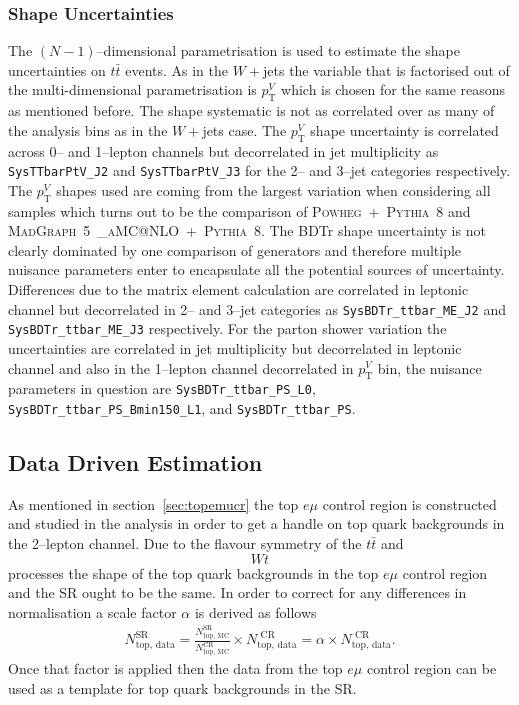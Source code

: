 \subsubsection{Shape Uncertainties}

The $(N-1)$--dimensional parametrisation is used to estimate the shape
uncertainties on $t\bar{t}$ events. As in the $W+$jets the variable that is
factorised out of the multi-dimensional parametrisation is $p_{\mathrm{T}}^V$ which is
chosen for the same reasons as mentioned before. The shape systematic is not as
correlated over as many of the analysis bins as in the $W+$jets case. The
$p_{\mathrm{T}}^V$ shape uncertainty is correlated across 0-- and 1--lepton channels but
decorrelated in jet multiplicity as \texttt{SysTTbarPtV\_J2} and
\texttt{SysTTbarPtV\_J3} for the 2-- and 3--jet categories respectively. The
$p_{\mathrm{T}}^V$ shapes used are coming from the largest variation when considering all
samples which turns out to be the comparison of
\textsc{Powheg}~+~\textsc{Pythia}~8 and
\textsc{MadGraph}~5~\textsc{\_aMC@NLO}~+~\textsc{Pythia}~8. The BDTr shape
uncertainty is not clearly dominated by one comparison of generators and
therefore multiple nuisance parameters enter to encapsulate all the potential
sources of uncertainty. Differences due to the matrix element calculation are
correlated in leptonic channel but decorrelated in 2-- and 3--jet categories as
\texttt{SysBDTr\_ttbar\_ME\_J2} and \texttt{SysBDTr\_ttbar\_ME\_J3}
respectively. For the parton shower variation the uncertainties are correlated
in jet multiplicity but decorrelated in leptonic channel and also in the
1--lepton channel decorrelated in $p_{\mathrm{T}}^V$ bin, the nuisance parameters in
question are \texttt{SysBDTr\_ttbar\_PS\_L0},
\texttt{SysBDTr\_ttbar\_PS\_Bmin150\_L1}, and \texttt{SysBDTr\_ttbar\_PS}.

\subsection{Data Driven Estimation}
\label{sec:ttbar_DD}

As mentioned in section~\ref{sec:topemucr} the top $e\mu$ control region is
constructed and studied in the analysis in order to get a handle on top quark
backgrounds in the 2--lepton channel. Due to the flavour symmetry of the
$t\bar{t}$ and $$Wt$$ processes the shape of the top quark backgrounds in the top
$e\mu$ control region and the SR ought to be the same. In order to correct for
any differences in normalisation a scale factor $\alpha$ is derived as follows
\begin{align}
  N_{\text{top, data}}^{\text{SR}}
  =
  \frac{N_{\text{top, MC}}^{\text{SR}}}{N_{\text{top, MC}}^{\text{CR}}}
  \times
  N_{\text{top, data}}^{\text{ CR}}
  = \alpha \times N_{\text{top, data}}^{\text{ CR}}.
  \label{eq:TTbar_DD_ExtrapFac}
\end{align}
Once that factor is applied then the data from the top $e\mu$ control region can
be used as a template for top quark backgrounds in the SR.

